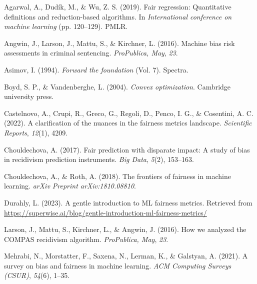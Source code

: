\documentclass[12pt, twoside]{amherstthesis}
\newenvironment{CSLReferences}[2]%
  {}%
  {\par}
\begin{document}
\hypertarget{refs}{}
\begin{CSLReferences}{1}{0}
\leavevmode{}%
Agarwal, A., Dudík, M., \& Wu, Z. S. (2019). Fair regression: Quantitative definitions and reduction-based algorithms. In \emph{International conference on machine learning} (pp. 120--129). PMLR.

\leavevmode{}%
Angwin, J., Larson, J., Mattu, S., \& Kirchner, L. (2016). Machine bias risk assessments in criminal sentencing. \emph{ProPublica, May}, \emph{23}.

\leavevmode{}%
Asimov, I. (1994). \emph{Forward the foundation} (Vol. 7). Spectra.

\leavevmode{}%
Boyd, S. P., \& Vandenberghe, L. (2004). \emph{Convex optimization}. Cambridge university press.

\leavevmode{}%
Castelnovo, A., Crupi, R., Greco, G., Regoli, D., Penco, I. G., \& Cosentini, A. C. (2022). A clarification of the nuances in the fairness metrics landscape. \emph{Scientific Reports}, \emph{12}(1), 4209.

\leavevmode{}%
Chouldechova, A. (2017). Fair prediction with disparate impact: A study of bias in recidivism prediction instruments. \emph{Big Data}, \emph{5}(2), 153--163.

\leavevmode{}%
Chouldechova, A., \& Roth, A. (2018). The frontiers of fairness in machine learning. \emph{arXiv Preprint arXiv:1810.08810}.

\leavevmode{}%
Durahly, L. (2023). A gentle introduction to ML fairness metrics. Retrieved from \url{https://superwise.ai/blog/gentle-introduction-ml-fairness-metrics/}

\leavevmode{}%
Larson, J., Mattu, S., Kirchner, L., \& Angwin, J. (2016). How we analyzed the COMPAS recidivism algorithm. \emph{ProPublica, May}, \emph{23}.

\leavevmode{}%
Mehrabi, N., Morstatter, F., Saxena, N., Lerman, K., \& Galstyan, A. (2021). A survey on bias and fairness in machine learning. \emph{ACM Computing Surveys (CSUR)}, \emph{54}(6), 1--35.


\end{CSLReferences}
\end{document}
